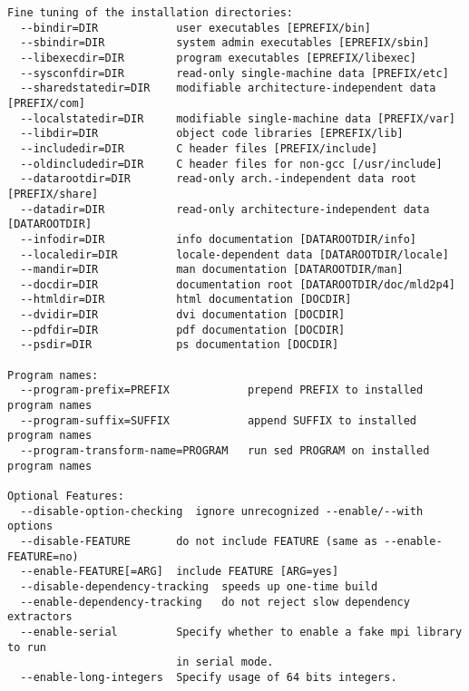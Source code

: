 \begin{verbatim}
Fine tuning of the installation directories:
  --bindir=DIR            user executables [EPREFIX/bin]
  --sbindir=DIR           system admin executables [EPREFIX/sbin]
  --libexecdir=DIR        program executables [EPREFIX/libexec]
  --sysconfdir=DIR        read-only single-machine data [PREFIX/etc]
  --sharedstatedir=DIR    modifiable architecture-independent data [PREFIX/com]
  --localstatedir=DIR     modifiable single-machine data [PREFIX/var]
  --libdir=DIR            object code libraries [EPREFIX/lib]
  --includedir=DIR        C header files [PREFIX/include]
  --oldincludedir=DIR     C header files for non-gcc [/usr/include]
  --datarootdir=DIR       read-only arch.-independent data root [PREFIX/share]
  --datadir=DIR           read-only architecture-independent data [DATAROOTDIR]
  --infodir=DIR           info documentation [DATAROOTDIR/info]
  --localedir=DIR         locale-dependent data [DATAROOTDIR/locale]
  --mandir=DIR            man documentation [DATAROOTDIR/man]
  --docdir=DIR            documentation root [DATAROOTDIR/doc/mld2p4]
  --htmldir=DIR           html documentation [DOCDIR]
  --dvidir=DIR            dvi documentation [DOCDIR]
  --pdfdir=DIR            pdf documentation [DOCDIR]
  --psdir=DIR             ps documentation [DOCDIR]

Program names:
  --program-prefix=PREFIX            prepend PREFIX to installed program names
  --program-suffix=SUFFIX            append SUFFIX to installed program names
  --program-transform-name=PROGRAM   run sed PROGRAM on installed program names

Optional Features:
  --disable-option-checking  ignore unrecognized --enable/--with options
  --disable-FEATURE       do not include FEATURE (same as --enable-FEATURE=no)
  --enable-FEATURE[=ARG]  include FEATURE [ARG=yes]
  --disable-dependency-tracking  speeds up one-time build
  --enable-dependency-tracking   do not reject slow dependency extractors
  --enable-serial         Specify whether to enable a fake mpi library to run
                          in serial mode.
  --enable-long-integers  Specify usage of 64 bits integers.


\end{verbatim}
